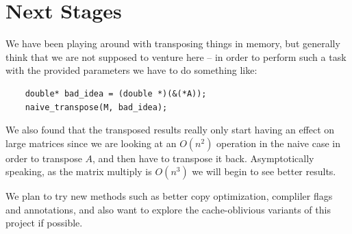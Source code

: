 \documentclass[11pt]{article}
\begin{document}
\section{Next Stages} %

We have been playing around with transposing things in memory, but generally think that we are not supposed to venture here -- in order to perform such a task with the provided parameters we have to do something like:

\begin{lstlisting}
    double* bad_idea = (double *)(&(*A));
    naive_transpose(M, bad_idea);
\end{lstlisting}

We also found that the transposed results really only start having an effect on large matrices since we are looking at an $O(n^2)$ operation in the naive case in order to transpose $A$, and then have to transpose it back.  Asymptotically speaking, as the matrix multiply is $O(n^3)$ we will begin to see better results.

We plan to try new methods such as better copy optimization, compliler flags and annotations, and also want to explore the cache-oblivious variants of this project if possible.
\end{document}
